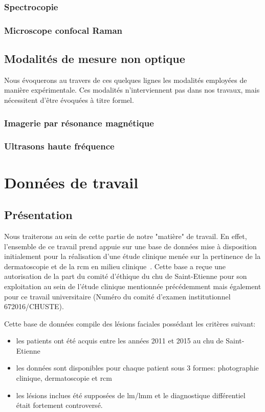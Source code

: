 \subsubsection{Spectrocopie}
\subsubsection{Microscope confocal Raman}

\subsection{Modalités de mesure non optique}
Nous évoquerons au travers de ces quelques lignes les modalités employées de manière expérimentale. Ces modalités n’interviennent pas dans nos travaux, mais nécessitent d’être évoquées à titre formel.

\subsubsection{Imagerie par résonance magnétique}
\subsubsection{Ultrasons haute fréquence}

\clearpage
\section{Données de travail}
\subsection{Présentation}
Nous traiterons au sein de cette partie de notre "matière" de travail. En effet, l'ensemble de ce travail prend appuie sur une base de données mise à disposition initialement pour la réalisation d'une étude clinique menée sur la pertinence de la dermatoscopie et de la \gls{rcm} en milieu clinique~\cite{Cinotti2018}. Cette base a reçue une autorisation de la part du comité d'éthique du \gls{chu} de Saint-Etienne pour son exploitation au sein de l'étude clinique mentionnée précédemment mais également pour ce travail universitaire (Numéro du comité d'examen institutionnel 672016/CHUSTE).\par 
Cette base de données compile des lésions faciales possédant les critères suivant:
\begin{itemize}
\item les patients ont été acquis entre les années 2011 et 2015 au \gls{chu} de Saint-Etienne
\item les données sont disponibles pour chaque patient sous 3 formes: photographie clinique, dermatoscopie et \gls{rcm}
\item les lésions inclues été supposées de \gls{lm}/\gls{lmm} et le diagnostique différentiel était fortement controversé.
\end{itemize}\par

